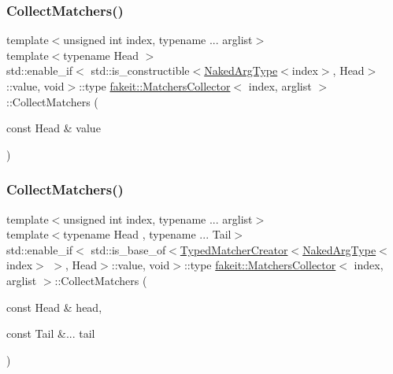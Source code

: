\mbox{\label{classfakeit_1_1MatchersCollector_affd243a89f758239d77c70dce6318087}} 
\subsubsection{\texorpdfstring{CollectMatchers()}{CollectMatchers()}\hspace{0.1cm}{\footnotesize\ttfamily [55/63]}}
{\footnotesize\ttfamily template$<$unsigned int index, typename ... arglist$>$ \\
template$<$typename Head $>$ \\
std\+::enable\+\_\+if$<$ std\+::is\+\_\+constructible$<$\mbox{\hyperlink{classfakeit_1_1MatchersCollector_aeda8ced6a2f0cb7c6e4f916f18a91730}{Naked\+Arg\+Type}}$<$index$>$, Head$>$\+::value, void$>$\+::type \mbox{\hyperlink{classfakeit_1_1MatchersCollector}{fakeit\+::\+Matchers\+Collector}}$<$ index, arglist $>$\+::Collect\+Matchers (\begin{DoxyParamCaption}\item[{const Head \&}]{value }\end{DoxyParamCaption})\hspace{0.3cm}{\ttfamily [inline]}}

\mbox{\label{classfakeit_1_1MatchersCollector_a40994e9802e933fb1bae91870d666dcb}} 
\subsubsection{\texorpdfstring{CollectMatchers()}{CollectMatchers()}\hspace{0.1cm}{\footnotesize\ttfamily [56/63]}}
{\footnotesize\ttfamily template$<$unsigned int index, typename ... arglist$>$ \\
template$<$typename Head , typename ... Tail$>$ \\
std\+::enable\+\_\+if$<$ std\+::is\+\_\+base\+\_\+of$<$\mbox{\hyperlink{structfakeit_1_1TypedMatcherCreator}{Typed\+Matcher\+Creator}}$<$\mbox{\hyperlink{classfakeit_1_1MatchersCollector_aeda8ced6a2f0cb7c6e4f916f18a91730}{Naked\+Arg\+Type}}$<$index$>$ $>$, Head$>$\+::value, void$>$\+::type \mbox{\hyperlink{classfakeit_1_1MatchersCollector}{fakeit\+::\+Matchers\+Collector}}$<$ index, arglist $>$\+::Collect\+Matchers (\begin{DoxyParamCaption}\item[{const Head \&}]{head,  }\item[{const Tail \&...}]{tail }\end{DoxyParamCaption})\hspace{0.3cm}{\ttfamily [inline]}}

